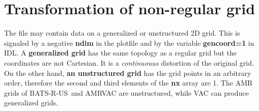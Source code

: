 \documentclass{article}
\newcommand{\BATSRUS}{BATS-R-US}
\begin{document}
\section{Transformation of non-regular grid \label{s-transform}}

   The file may contain data on a generalized or unstructured 2D grid.
   This is signaled by a negative {\bf ndim} in the plotfile 
   and by the variable {\bf gencoord=1} in IDL.
   A {\bf generalized grid} has the same topology as a regular grid
   but the coordinates are not Cartesian. It is a {\it continuouus}
   distortion of the original grid. On the other hand, 
   {\bf an unstructured grid} has the grid points in an arbitrary
   order, therefore the second and third elements of the 
   {\bf nx} array are 1. The AMR grids of \BATSRUS\ and AMRVAC are
   unstructured, while VAC can produce generalized grids.
\end{document}
